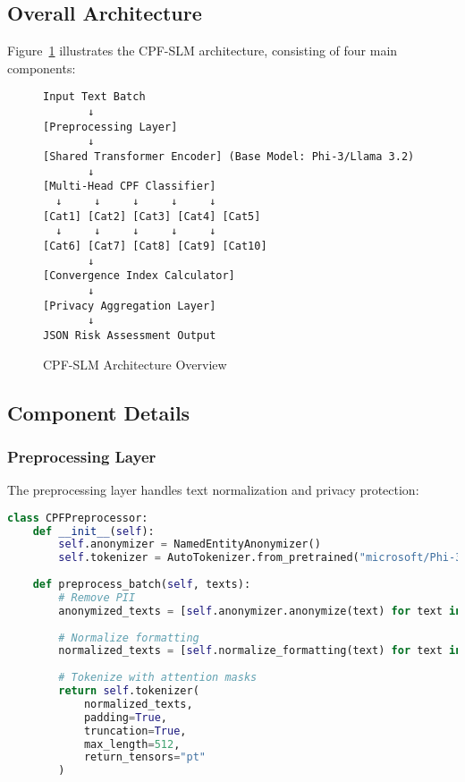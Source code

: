 \documentclass[11pt,a4paper]{article}
\begin{document}
\subsection{Overall Architecture}

Figure~\ref{fig:architecture} illustrates the CPF-SLM architecture, consisting of four main components:

\begin{figure}[h!]
\centering
\begin{verbatim}
Input Text Batch
       ↓
[Preprocessing Layer]
       ↓
[Shared Transformer Encoder] (Base Model: Phi-3/Llama 3.2)
       ↓
[Multi-Head CPF Classifier]
  ↓     ↓     ↓     ↓     ↓
[Cat1] [Cat2] [Cat3] [Cat4] [Cat5]
  ↓     ↓     ↓     ↓     ↓
[Cat6] [Cat7] [Cat8] [Cat9] [Cat10]
       ↓
[Convergence Index Calculator]
       ↓
[Privacy Aggregation Layer]
       ↓
JSON Risk Assessment Output
\end{verbatim}
\caption{CPF-SLM Architecture Overview}
\label{fig:architecture}
\end{figure}

\subsection{Component Details}

\subsubsection{Preprocessing Layer}

The preprocessing layer handles text normalization and privacy protection:

\begin{lstlisting}[language=Python, caption=Preprocessing Pipeline]
class CPFPreprocessor:
    def __init__(self):
        self.anonymizer = NamedEntityAnonymizer()
        self.tokenizer = AutoTokenizer.from_pretrained("microsoft/Phi-3-mini")
    
    def preprocess_batch(self, texts):
        # Remove PII
        anonymized_texts = [self.anonymizer.anonymize(text) for text in texts]
        
        # Normalize formatting
        normalized_texts = [self.normalize_formatting(text) for text in anonymized_texts]
        
        # Tokenize with attention masks
        return self.tokenizer(
            normalized_texts,
            padding=True,
            truncation=True,
            max_length=512,
            return_tensors="pt"
        )
\end{lstlisting}
\end{document}
